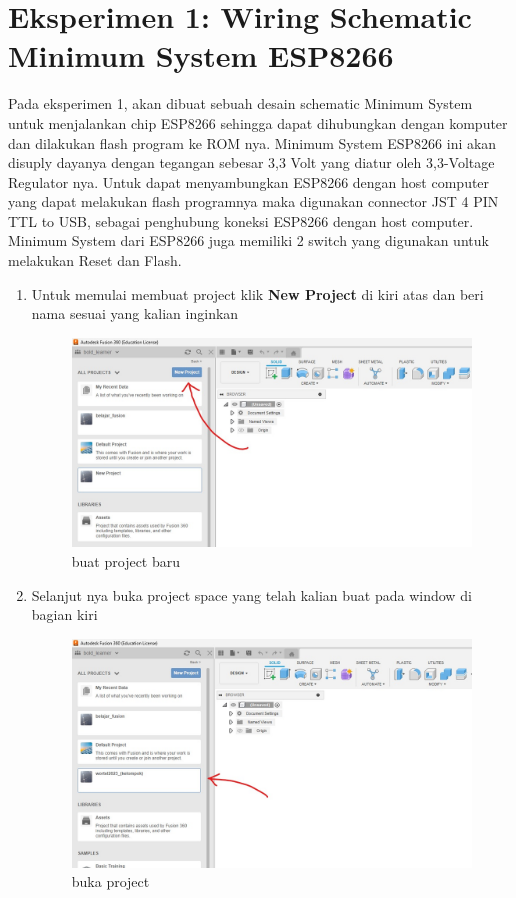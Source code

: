 \section{Eksperimen 1: Wiring Schematic Minimum System ESP8266}
Pada eksperimen 1, akan dibuat sebuah desain schematic Minimum System untuk menjalankan 
chip ESP8266 sehingga dapat dihubungkan dengan komputer dan dilakukan flash program ke ROM nya. 
Minimum System ESP8266 ini akan disuply dayanya dengan tegangan sebesar 3,3 Volt yang diatur 
oleh 3,3-Voltage Regulator nya. Untuk dapat menyambungkan ESP8266 dengan host computer yang 
dapat melakukan flash programnya maka digunakan connector JST 4 PIN TTL to USB, 
sebagai penghubung koneksi ESP8266 dengan host computer. Minimum System dari ESP8266 juga memiliki 
2 switch yang digunakan untuk melakukan Reset dan Flash.
\begin{enumerate}
    \item Untuk memulai membuat project klik \textbf{New Project} di kiri atas dan beri nama sesuai yang kalian inginkan
        \begin{figure}[H]
            \centering
            \includegraphics[width=0.6\linewidth]{P1/img/gambar1.jpeg}
            \caption{buat project baru} 
            \label{fig:buat project baru}
        \end{figure}
    \item Selanjut nya buka project space yang telah kalian buat pada window di bagian kiri
        \begin{figure}[H]
            \centering
            \includegraphics[width=0.6\linewidth]{P1/img/gambar2.jpeg}
            \caption{buka project} 
            \label{fig:buka project}

\end{figure}
\end{enumerate}
